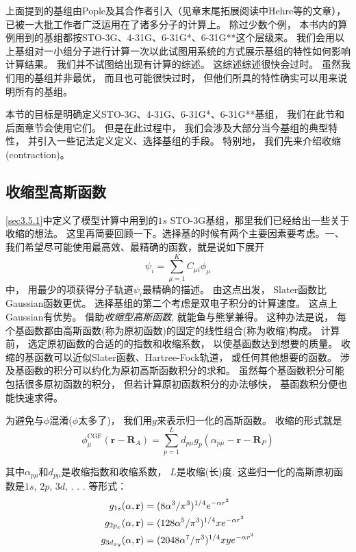 上面提到的基组由Pople及其合作者引入（见章末尾拓展阅读中Hehre等的文章），
已被一大批工作者广泛运用在了诸多分子的计算上。
除过少数个例，
本书内的算例用到的基组都按STO-3G、4-31G、6-31G*、6-31G**这个层级来。
我们会用以上基组对一小组分子进行计算一次以此试图用系统的方式展示基组的特性如何影响计算结果。
我们并不试图给出现有计算的综述。
这综述综述很快会过时。
虽然我们用的基组并非最优，
而且也可能很快过时，
但他们所具的特性确实可以用来说明所有的基组。


本节的目标是明确定义STO-3G、4-31G、6-31G*、6-31G**基组，
我们在此节和后面章节会使用它们。
但是在此过程中，
我们会涉及大部分当今基组的典型特性，
并引入一些记法定义定义、选择基组的手段。
特别地，
我们先来介绍收缩(contraction)。

\subsection{收缩型高斯函数}
\ref{sec3.5.1}中定义了模型计算中用到的$1s$ STO-3G基组，那里我们已经给出一些关于收缩的想法。
这里再简要回顾一下。选择基的时候有两个主要因素要考虑。一、我们希望尽可能使用最高效、最精确的函数，就是说如下展开
\begin{equation}
	\psi_i=\sum_{\mu=1}^{K}C_{\mu i}\phi_\mu
\end{equation}
中，
用最少的项获得分子轨道$\psi_i$最精确的描述。
由这点出发，
Slater函数比Gaussian函数更优。
选择基组的第二个考虑是双电子积分的计算速度。
这点上Gaussian有优势。
借助\emph{收缩型高斯函数}, 
就能鱼与熊掌兼得。
这种办法是说，
每个基函数都由高斯函数(称为原初函数)的固定的线性组合(称为收缩)构成。
计算前，
选定原初函数的合适的的指数和收缩系数，
以使基函数达到想要的质量。
收缩的基函数可以近似Slater函数、Hartree-Fock轨道，
或任何其他想要的函数。
涉及基函数的积分可以约化为原初高斯函数积分的求和。
虽然每个基函数积分可能包括很多原初函数的积分，
但若计算原初函数积分的办法够快，
基函数积分便也能快速求得。


为避免与$\phi$混淆($\phi$太多了)，
我们用$g$来表示归一化的高斯函数。
收缩的形式就是
\begin{equation}
	\phi^\mathrm{CGF}_\mu(\mathbf{r-R}_A)=\sum_{p=1}^{L}d_{p\mu}g_p(\alpha_{p\mu}-\mathbf{r-R}_P)
	\label{3.283}
\end{equation}

其中$\alpha_{p\mu}$和$d_{p\mu}$是收缩指数和收缩系数，
$L$是收缩(长)度. 
这些归一化的高斯原初函数是$1s$, 
$2p$, 
$3d$, 
.
.
.
等形式：
\begin{align}
	g_{1s}(\alpha,\mathbf{r})      & = (8\alpha^3/\pi^3)^{1/4}       e^{-\alpha r^2}\\
	g_{2p_x}(\alpha,\mathbf{r})    & = (128\alpha^5/\pi^3)^{1/4}  x  e^{-\alpha r^2}\\
	g_{3d_{xy}}(\alpha,\mathbf{r}) & = (2048\alpha^7/\pi^3)^{1/4} xy e^{-\alpha r^2}
\end{align}

